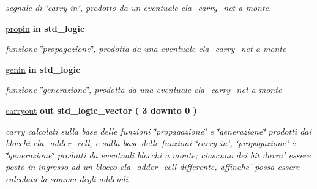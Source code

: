 \begin{DoxyCompactItemize}
\begin{DoxyCompactList}\small\item\em segnale di \char`\"{}carry-\/in\char`\"{}, prodotto da un eventuale \hyperlink{classcla__carry__net}{cla\+\_\+carry\+\_\+net} a monte. \end{DoxyCompactList}\item 
\hyperlink{group___carry_network_ga422e8e7ee01fc7ac7b7390cd2ad8c87b}{propin}  {\bfseries {\bfseries \textcolor{vhdlchar}{in}\textcolor{vhdlchar}{ }}} {\bfseries \textcolor{vhdlchar}{std\+\_\+logic}\textcolor{vhdlchar}{ }} 
\begin{DoxyCompactList}\small\item\em funzione \char`\"{}propagazione\char`\"{}, prodotta da una eventuale \hyperlink{classcla__carry__net}{cla\+\_\+carry\+\_\+net} a monte \end{DoxyCompactList}\item 
\hyperlink{group___carry_network_ga0a46d5193cb73eb993bc5d4f69741d0a}{genin}  {\bfseries {\bfseries \textcolor{vhdlchar}{in}\textcolor{vhdlchar}{ }}} {\bfseries \textcolor{vhdlchar}{std\+\_\+logic}\textcolor{vhdlchar}{ }} 
\begin{DoxyCompactList}\small\item\em funzione \char`\"{}generazione\char`\"{}, prodotta da una eventuale \hyperlink{classcla__carry__net}{cla\+\_\+carry\+\_\+net} a monte \end{DoxyCompactList}\item 
\hyperlink{group___carry_network_ga6b265f3fe41195485dfedd9824c3598f}{carryout}  {\bfseries {\bfseries \textcolor{vhdlchar}{out}\textcolor{vhdlchar}{ }}} {\bfseries \textcolor{vhdlchar}{std\+\_\+logic\+\_\+vector}\textcolor{vhdlchar}{ }\textcolor{vhdlchar}{(}\textcolor{vhdlchar}{ }\textcolor{vhdlchar}{ } \textcolor{vhdldigit}{3} \textcolor{vhdlchar}{ }\textcolor{vhdlchar}{downto}\textcolor{vhdlchar}{ }\textcolor{vhdlchar}{ } \textcolor{vhdldigit}{0} \textcolor{vhdlchar}{ }\textcolor{vhdlchar}{)}\textcolor{vhdlchar}{ }} 
\begin{DoxyCompactList}\small\item\em carry calcolati sulla base delle funzioni \char`\"{}propagazione\char`\"{} e \char`\"{}generazione\char`\"{} prodotti dai blocchi \hyperlink{classcla__adder__cell}{cla\+\_\+adder\+\_\+cell}, e sulla base delle funzioni \char`\"{}carry-\/in\char`\"{}, \char`\"{}propagazione\char`\"{} e \char`\"{}generazione\char`\"{} prodotti da eventuali blocchi a monte; ciascuno dei bit dovra' essere posto in ingresso ad un blocco \hyperlink{classcla__adder__cell}{cla\+\_\+adder\+\_\+cell} differente, affinche' possa essere calcolata la somma degli addendi \end{DoxyCompactList}\item 

\end{DoxyCompactItemize}
